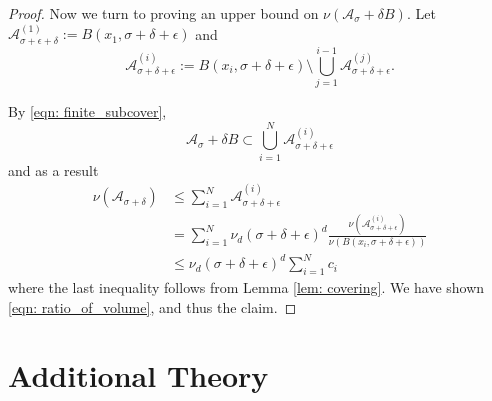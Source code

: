 \documentclass{article}
\newcommand{\Aset}{\mathcal{A}}
\newcommand{\Asig}{\Aset_{\sigma}}
\newcommand{\1}{\mathbf{1}}
\theoremstyle{alden}
\theoremstyle{aldenthm}
\theoremstyle{remark}
\begin{document}
\begin{proof}
	
	Now we turn to proving an upper bound on $\nu(\Asig + \delta B)$. Let $\Aset_{\sigma + \epsilon + \delta}^{(1)} := B(x_1,\sigma + \delta + \epsilon)$ and
	\begin{equation*}
	\Aset_{\sigma + \delta + \epsilon}^{(i)} := B(x_i,\sigma + \delta + \epsilon) \setminus \bigcup_{j = 1}^{i - 1} \Aset_{\sigma + \delta + \epsilon}^{(j)}. \tag{$i = 1,\ldots,N$}
	\end{equation*}
	
	By \eqref{eqn: finite_subcover},
	\begin{equation*}
	\Aset_{\sigma} + \delta B \subset \bigcup_{i =1}^{N} \Aset_{\sigma + \delta + \epsilon}^{(i)}
	\end{equation*}
	and as a result
	\begin{align*}
	\nu(\Aset_{\sigma + \delta}) & \leq \sum_{i = 1}^{N} \Aset_{\sigma + \delta + \epsilon}^{(i)} \\
	& = \sum_{i = 1}^{N} \nu_d (\sigma + \delta + \epsilon)^d \frac{\nu(\Aset_{\sigma + \delta + \epsilon}^{(i)})}{\nu(B(x_i, \sigma + \delta + \epsilon))} \\
	& \leq \nu_d (\sigma + \delta + \epsilon)^d \sum_{i = 1}^{N} c_i
	\end{align*}
	where the last inequality follows from Lemma \ref{lem: covering}. We have shown \eqref{eqn: ratio_of_volume}, and thus the claim.
\end{proof}

\section{Additional Theory}
\end{document}
